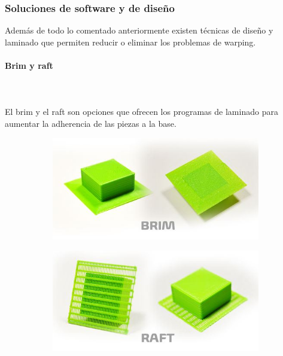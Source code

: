 \documentclass[11pt,a4paper]{article}
\begin{document}
		\subsubsection{Soluciones de software y de diseño}Además de todo lo comentado anteriormente existen técnicas de diseño y laminado que permiten reducir o eliminar los problemas de warping.
			\paragraph{Brim y raft}\mbox{}\\\\
El brim y el raft son opciones que ofrecen los programas de laminado para aumentar la adherencia de las piezas a la base.
\begin{figure}[H]
    \centering
    \begin{subfigure}[b]{0.4\textwidth}
        \includegraphics[width=\textwidth,cfbox=azul_marcos 4pt 0pt]{FOTOS/BRIM}
    \end{subfigure}
    \qquad %
    \begin{subfigure}[b]{0.4\textwidth}
        \includegraphics[width=\textwidth,cfbox=azul_marcos 4pt 0pt]{FOTOS/RAFT}
    \end{subfigure}   
\end{figure}
\end{document}
